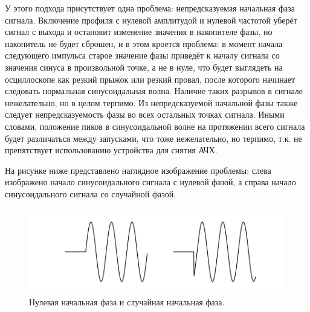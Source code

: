 \documentclass[rusmathsym, eqnumwithinsec, amspack, hyperref]{bomgost}
\begin{document}
У этого подхода присутствует одна проблема: непредсказуемая начальная фаза сигнала. Включение профиля с нулевой амплитудой и нулевой частотой уберёт сигнал с выхода и остановит изменение значения в накопителе фазы, но накопитель не будет сброшен, и в этом кроется проблема: в момент начала следующего импульса старое значение фазы приведёт к началу сигнала со значения синуса в произвольной точке, а не в нуле, что будет выглядеть на осциллоскопе как резкий прыжок или резкий провал, после которого начинает следовать нормальная синусоидальная волна. Наличие таких разрывов в сигнале нежелательно, но в целом терпимо. Из непредсказуемой начальной фазы также следует непредсказуемость фазы во всех остальных точках сигнала. Иными словами, положение пиков в синусоидальной волне на протяжении всего сигнала будет различаться между запусками, что тоже нежелательно, но терпимо, т.к. не препятствует использованию устройства для снятия АЧХ.

На рисунке ниже представлено наглядное изображение проблемы: слева изображено начало синусоидального сигнала с нулевой фазой, а справа начало синусоидального сигнала со случайной фазой.

%
%
\begin{gostfigure}
\begin{figure}[H]
\centering
\includegraphics{data/random_start_phase.pdf}
\caption{Нулевая начальная фаза и случайная начальная фаза.}
\label{fig:random_start_phase}
\end{figure}
\end{gostfigure}
\end{document}
